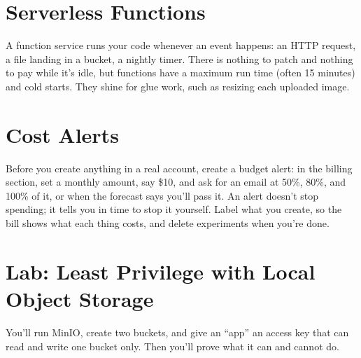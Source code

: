 \section{Serverless Functions}\label{07-cloud-building-blocks:serverless-functions}

A function service runs your code whenever an event happens: an HTTP request, a file landing in a bucket, a nightly timer. There is nothing to patch and nothing to pay while it's idle, but functions have a maximum run time (often 15 minutes) and cold starts. They shine for glue work, such as resizing each uploaded image.

\section{Cost Alerts}\label{07-cloud-building-blocks:cost-alerts}

Before you create anything in a real account, create a budget alert: in the billing section, set a monthly amount, say \$10, and ask for an email at 50\%, 80\%, and 100\% of it, or when the forecast says you'll pass it. An alert doesn't stop spending; it tells you in time to stop it yourself. Label what you create, so the bill shows what each thing costs, and delete experiments when you're done.

\section{Lab: Least Privilege with Local Object Storage}\label{07-cloud-building-blocks:lab-least-privilege-with-local-object-storage}

You'll run MinIO, create two buckets, and give an ``app'' an access key that can read and write one bucket only. Then you'll prove what it can and cannot do.

